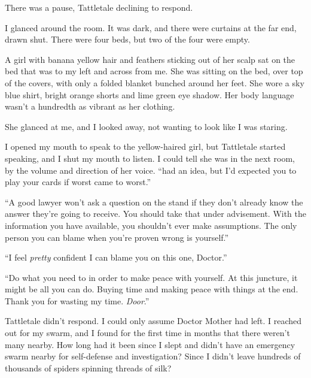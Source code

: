 There was a pause, Tattletale declining to respond.



I glanced around the room.  It was dark, and there were curtains at the far end, drawn shut.  There were four beds, but two of the four were empty.



A girl with banana yellow hair and feathers sticking out of her scalp sat on the bed that was to my left and across from me.  She was sitting on the bed, over top of the covers, with only a folded blanket bunched around her feet.  She wore a sky blue shirt, bright orange shorts and lime green eye shadow. Her body language wasn't a hundredth as vibrant as her clothing.



She glanced at me, and I looked away, not wanting to look like I was staring.



I opened my mouth to speak to the yellow-haired girl, but Tattletale started speaking, and I shut my mouth to listen.  I could tell she was in the next room, by the volume and direction of her voice.  ``\ldotsI had an idea, but I'd expected you to play your cards if worst came to worst.''



``A good lawyer won't ask a question on the stand if they don't already know the answer they're going to receive.  You should take that under advisement.  With the information you have available, you shouldn't ever make assumptions.  The only person you can blame when you're proven wrong is yourself.''



``I feel\emph{ pretty} confident I can blame you on this one, Doctor.''



``Do what you need to in order to make peace with yourself.  At this juncture, it might be all you can do.  Buying time and making peace with things at the end.  Thank you for wasting my time.  \emph{Door}.''



Tattletale didn't respond.  I could only assume Doctor Mother had left.  I reached out for my swarm, and I found for the first time in months that there weren't many nearby.  How long had it been since I slept and didn't have an emergency swarm nearby for self-defense and investigation?  Since I didn't leave hundreds of thousands of spiders spinning threads of silk?



